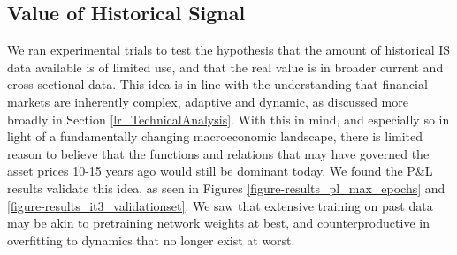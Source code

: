 \documentclass[a4paper,11pt,oneside]{article}
\theoremstyle{plain}
\theoremstyle{definition}
\begin{document}
\begin{figure}[H]
			\label{figure_ogdlr_delta_encoding_groups}
		\end{figure}
		
		
		
		
		\newpage

	\subsection{Value of Historical Signal}\label{results_data_hist}
		
	We ran experimental trials to test the hypothesis that the amount of historical IS data available is of limited use, and that the real value is in broader current and cross sectional data. This idea is in line with the understanding that financial markets are inherently complex, adaptive and dynamic, as discussed more broadly in Section \ref{lr_TechnicalAnalysis}. With this in mind, and especially so in light of a fundamentally changing macroeconomic landscape, there is limited reason to believe that the functions and relations that may have governed the asset prices 10-15 years ago would still be dominant today. We found the P\&L results validate this idea, as seen in Figures \ref{figure-results_pl_max_epochs} and \ref{figure-results_it3_validationset}. We saw that extensive training on past data may be akin to pretraining network weights at best, and counterproductive in overfitting to dynamics that no longer exist at worst.
	
\end{document}
